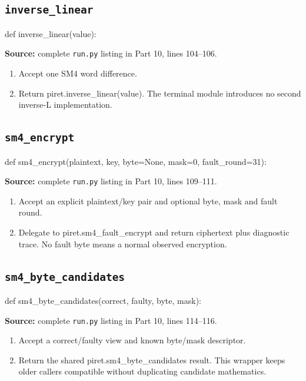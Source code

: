 \subsection{\texttt{inverse\_\allowbreak{}linear}}
\begin{lightcode}
def inverse_linear(value):
\end{lightcode}
\noindent\textbf{Source:} complete \texttt{run.py} listing in Part 10, lines 104--106.
\begin{enumerate}
\item Accept one SM4 word difference.
\item Return piret.inverse\_linear(value). The terminal module introduces no second inverse-L implementation.
\end{enumerate}
\subsection{\texttt{sm4\_\allowbreak{}encrypt}}
\begin{lightcode}
def sm4_encrypt(plaintext, key, byte=None, mask=0, fault_round=31):
\end{lightcode}
\noindent\textbf{Source:} complete \texttt{run.py} listing in Part 10, lines 109--111.
\begin{enumerate}
\item Accept an explicit plaintext/key pair and optional byte, mask and fault round.
\item Delegate to piret.sm4\_fault\_encrypt and return ciphertext plus diagnostic trace. No fault byte means a normal observed encryption.
\end{enumerate}
\subsection{\texttt{sm4\_\allowbreak{}byte\_\allowbreak{}candidates}}
\begin{lightcode}
def sm4_byte_candidates(correct, faulty, byte, mask):
\end{lightcode}
\noindent\textbf{Source:} complete \texttt{run.py} listing in Part 10, lines 114--116.
\begin{enumerate}
\item Accept a correct/faulty view and known byte/mask descriptor.
\item Return the shared piret.sm4\_byte\_candidates result. This wrapper keeps older callers compatible without duplicating candidate mathematics.
\end{enumerate}
